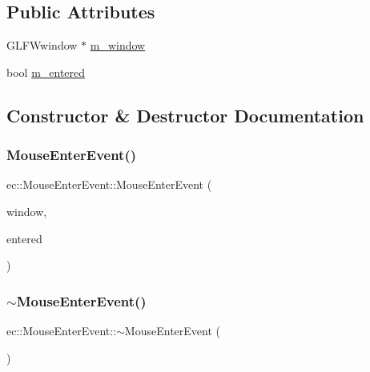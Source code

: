 \subsection*{Public Attributes}
\begin{DoxyCompactItemize}
\item 
G\+L\+F\+Wwindow $\ast$ \mbox{\hyperlink{structec_1_1_mouse_enter_event_affdb33db16df7493f83e19cd70cfea3c}{m\+\_\+window}}
\item 
bool \mbox{\hyperlink{structec_1_1_mouse_enter_event_ae778f98aa805ff1ce3ba6872177e3fd1}{m\+\_\+entered}}
\end{DoxyCompactItemize}


\subsection{Constructor \& Destructor Documentation}
\mbox{\label{structec_1_1_mouse_enter_event_a8683590d2b99dbb3bf3db3cd50951797}} 
\subsubsection{\texorpdfstring{Mouse\+Enter\+Event()}{MouseEnterEvent()}}
{\footnotesize\ttfamily ec\+::\+Mouse\+Enter\+Event\+::\+Mouse\+Enter\+Event (\begin{DoxyParamCaption}\item[{G\+L\+F\+Wwindow $\ast$}]{window,  }\item[{const bool}]{entered }\end{DoxyParamCaption})}

\mbox{\label{structec_1_1_mouse_enter_event_accbd4fca68e8e582493fa3d636b9d293}} 
\subsubsection{\texorpdfstring{$\sim$\+Mouse\+Enter\+Event()}{~MouseEnterEvent()}}
{\footnotesize\ttfamily ec\+::\+Mouse\+Enter\+Event\+::$\sim$\+Mouse\+Enter\+Event (\begin{DoxyParamCaption}{ }\end{DoxyParamCaption})}



